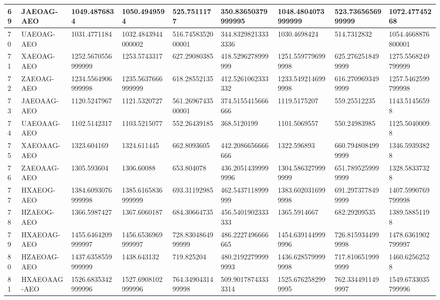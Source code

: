 {\begin{longtable}{|l|l|l|l|l|l|l|l|l|}
        69 & JAEOAG-AEO & 1049.4876834 & 1050.4949594 & 525.7511177 & 350.83650379999995 & 1048.4804073999999 & 523.7365656999999 & 1072.47745268 \\ \hline
        70 & UAEOAG-AEO & 1031.4771184 & 1032.4843944000002 & 516.7458352000001 & 344.83298213333336 & 1030.4698424 & 514.7312832 & 1054.4668876800001 \\ \hline
        71 & XAEOAG-AEO & 1252.5670556999999 & 1253.5743317 & 627.29080385 & 418.5296278999999 & 1251.5597796999998 & 625.2762518499999 & 1275.5568249799999 \\ \hline
        72 & ZAEOAG-AEO & 1234.5564906999998 & 1235.5637666999999 & 618.28552135 & 412.5261062333332 & 1233.5492146999998 & 616.2709693499999 & 1257.5462599799998 \\ \hline
        73 & JAEOAAG-AEO & 1120.5247967 & 1121.5320727 & 561.2696743500001 & 374.5155415666666 & 1119.5175207 & 559.25512235 & 1143.51456598 \\ \hline
        74 & UAEOAAG-AEO & 1102.5142317 & 1103.5215077 & 552.26439185 & 368.5120199 & 1101.5069557 & 550.24983985 & 1125.50400098 \\ \hline
        75 & XAEOAAG-AEO & 1323.604169 & 1324.611445 & 662.8093605 & 442.2086656666666 & 1322.596893 & 660.7948084999999 & 1346.59393828 \\ \hline
        76 & ZAEOAAG-AEO & 1305.593604 & 1306.60088 & 653.804078 & 436.20514399999996 & 1304.5863279999999 & 651.7895259999999 & 1328.58337328 \\ \hline
        77 & HXAEOG-AEO & 1384.6093076999998 & 1385.6165836999999 & 693.31192985 & 462.5437118999999 & 1383.6020316999998 & 691.2973778499999 & 1407.5990769799998 \\ \hline
        78 & HZAEOG-AEO & 1366.5987427 & 1367.6060187 & 684.30664735 & 456.5401902333333 & 1365.5914667 & 682.29209535 & 1389.58851198 \\ \hline
        79 & HXAEOAG-AEO & 1455.6464209999997 & 1456.6536969999997 & 728.8304864999999 & 486.2227496666665 & 1454.6391449999996 & 726.8159344999998 & 1478.6361902799997 \\ \hline
        80 & HZAEOAG-AEO & 1437.6358559999999 & 1438.643132 & 719.825204 & 480.21922799999993 & 1436.6285799999998 & 717.8106519999999 & 1460.62562528 \\ \hline
        81 & HXAEOAAG-AEO & 1526.6835342999996 & 1527.6908102999996 & 764.3490431499998 & 509.90178743333314 & 1525.6762582999995 & 762.3344911499997 & 1549.6733035799996 \\ \hline

\end{longtable}}
